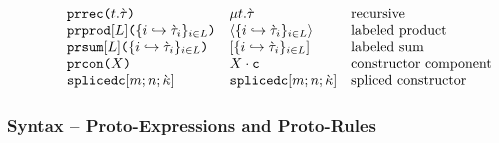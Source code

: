 \[\begin{array}{lrlllll}
&&& \acerec{t}{\ctau} & \rect{t}{\ctau} & \text{recursive}\\
&&& \aceprod{\labelset}{\mapschema{\ctau}{i}{\labelset}} & \prodt{\mapschema{\ctau}{i}{\labelset}} & \text{labeled product}\\
&&& \acesum{\labelset}{\mapschema{\ctau}{i}{\labelset}} & \sumt{\mapschema{\ctau}{i}{\labelset}} & \text{labeled sum}\\
&&& \acemcon{X} & \mcon{X} & \text{constructor component}\\
&&& \acesplicedc{m}{n}{\cekappa} & \splicedc{m}{n}{\cekappa} & \text{spliced constructor}%
\end{array}\]

\subsubsection{Syntax -- Proto-Expressions and Proto-Rules}
